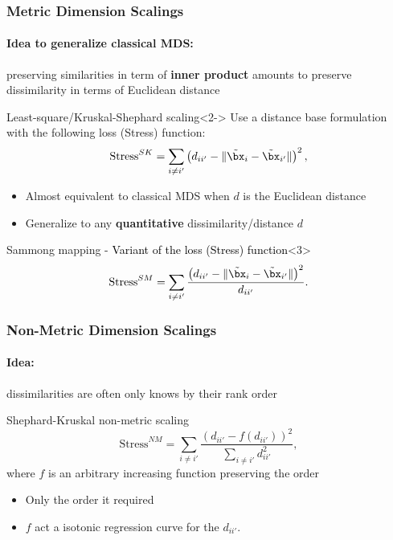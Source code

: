 \documentclass{beamer}\usepackage[]{graphicx}\usepackage[]{color}
\begin{document}
\begin{frame}
  \frametitle{Metric Dimension Scalings}
  
  \paragraph{Idea to generalize classical MDS:} preserving similarities in term of \alert{\bf inner product} amounts to preserve dissimilarity in terms of Euclidean distance

  \begin{block}{Least-square/Kruskal-Shephard scaling}<2->
      Use a distance base formulation with the following loss (Stress) function:
      \begin{equation*}
        \text{Stress}^{SK} = \sum_{i\neq i'} \left(d_{ii'} - \|\tilde\bx_i - \tilde\bx_{i'}\| \right)^2,
      \end{equation*}
      \begin{itemize}
        \item[\rsa] Almost equivalent to classical MDS when $d$ is the Euclidean distance
        \item[\rsa] Generalize to any \alert{\bf quantitative} dissimilarity/distance $d$
      \end{itemize}
  \end{block}

  \begin{block}{Sammong mapping - \textcolor{black}{Variant of the loss (Stress) function}}<3>
    \vspace{-.5cm}
      \begin{equation*}
        \text{Stress}^{SM} = \sum_{i\neq i'} \frac{\left(d_{ii'} - \|\tilde\bx_i - \tilde\bx_{i'}\| \right)^2}{d_{ii'}}.
      \end{equation*}
  \end{block}

\end{frame}


\begin{frame}
  \frametitle{Non-Metric Dimension Scalings}
  
  \paragraph{Idea:} dissimilarities are often only knows by their rank order

  \begin{block}{Shephard-Kruskal non-metric scaling}
      \begin{equation*}
        \text{Stress}^{NM} = \sum_{i\neq i'} \frac{\left(d_{ii'} - f(d_{ii'}) \right)^2}{\sum_{i\neq i'} d_{ii'}^2},
      \end{equation*}
      where $f$ is an arbitrary increasing function preserving the order
      \begin{itemize}
        \item[\rsa] Only the order it required
        \item[\rsa] $f$ act a isotonic regression curve for the $d_{ii'}$. 
      \end{itemize}
  \end{block}

\end{frame}
\end{document}
